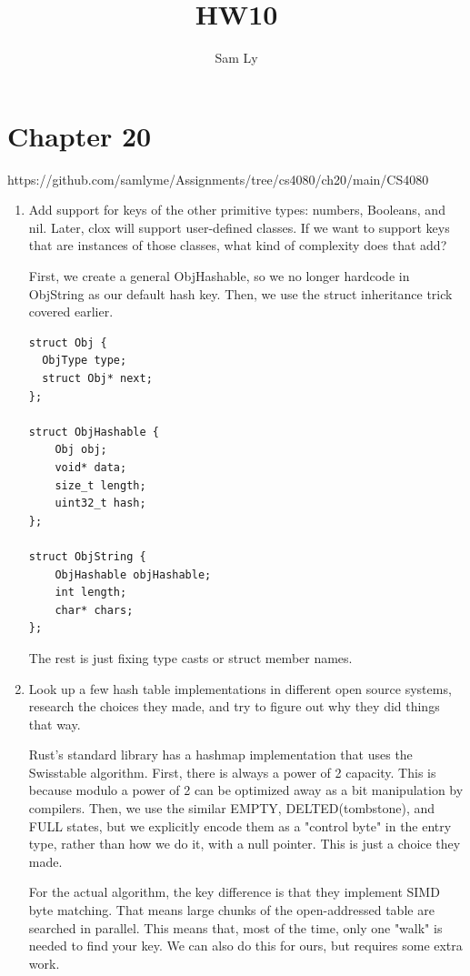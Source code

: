 \documentclass{article}
\title{HW10}
\author{Sam Ly}
\begin{document}
\maketitle

\section*{Chapter 20}
https://github.com/samlyme/Assignments/tree/cs4080/ch20/main/CS4080

\begin{enumerate}
    \item {
        Add support for keys of the other primitive types: numbers, Booleans, 
        and nil. Later, clox will support user-defined classes. If we want to 
        support keys that are instances of those classes, what kind of 
        complexity does that add?

        First, we create a general ObjHashable, so we no longer hardcode in 
        ObjString as our default hash key. Then, we use the struct inheritance 
        trick covered earlier.

        \begin{verbatim}
struct Obj {
  ObjType type;
  struct Obj* next;
};

struct ObjHashable {
    Obj obj;
    void* data;
    size_t length;
    uint32_t hash;
};

struct ObjString {
    ObjHashable objHashable;
    int length;
    char* chars;
};
        \end{verbatim}

        The rest is just fixing type casts or struct member names.
    }

    \item {
        Look up a few hash table implementations in different open source systems, 
        research the choices they made, and try to figure out why they did things 
        that way.

        Rust's standard library has a hashmap implementation that uses the 
        Swisstable algorithm. First, there is always a power of 2 capacity. This 
        is because modulo a power of 2 can be optimized away as a bit manipulation 
        by compilers. Then, we use the similar EMPTY, DELTED(tombstone), and FULL 
        states, but we explicitly encode them as a "control byte" in the entry 
        type, rather than how we do it, with a null pointer. This is just a choice 
        they made.

        For the actual algorithm, the key difference is that they implement SIMD 
        byte matching. That means large chunks of the open-addressed table are 
        searched in parallel. This means that, most of the time, only one "walk" 
        is needed to find your key. We can also do this for ours, but requires some 
        extra work.

}
\end{enumerate}
\end{document}
